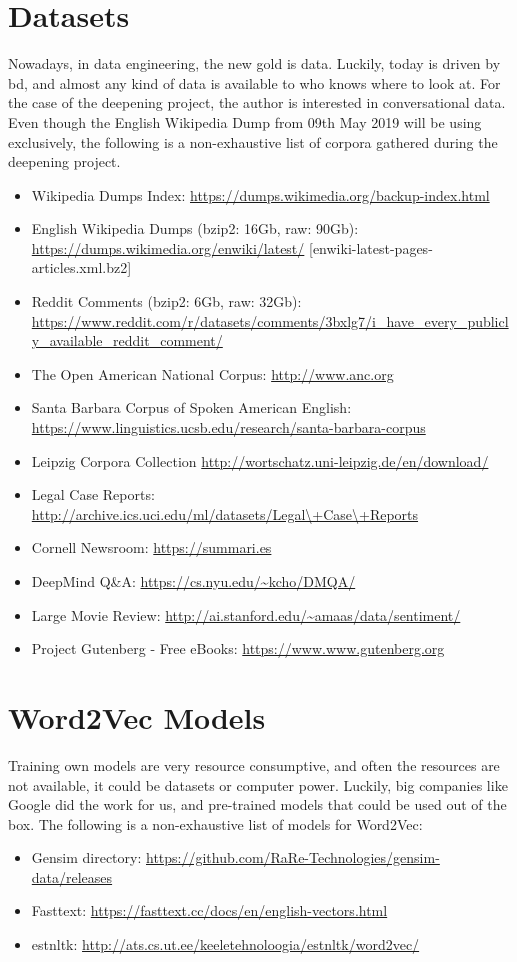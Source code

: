 \section{Datasets}
Nowadays, in data engineering, the new gold is data. Luckily, today is driven by \gls{bd}, and almost any kind of data is available to who knows where to look at. For the case of the deepening project, the author is interested in conversational data. Even though the English Wikipedia Dump from 09th May 2019 will be using exclusively, the following is a non-exhaustive list of corpora gathered during the deepening project.

\begin{itemize}
    \setlength\itemsep{0em}
    \item Wikipedia Dumps Index: \url{https://dumps.wikimedia.org/backup-index.html}
    \item English Wikipedia Dumps (bzip2: 16Gb, raw: 90Gb): \url{https://dumps.wikimedia.org/enwiki/latest/} [enwiki-latest-pages-articles.xml.bz2]
    \item Reddit Comments (bzip2: 6Gb, raw: 32Gb): \url{https://www.reddit.com/r/datasets/comments/3bxlg7/i_have_every_publicly_available_reddit_comment/}
    \item The Open American National Corpus: \url{http://www.anc.org}
    \item Santa Barbara Corpus of Spoken American English: \url{https://www.linguistics.ucsb.edu/research/santa-barbara-corpus}
    \item Leipzig Corpora Collection \url{http://wortschatz.uni-leipzig.de/en/download/}
    \item Legal Case Reports: \url{http://archive.ics.uci.edu/ml/datasets/Legal\+Case\+Reports}
    \item Cornell Newsroom: \url{https://summari.es}
    \item DeepMind Q\&A: \url{https://cs.nyu.edu/\~kcho/DMQA/}
    \item Large Movie Review: \url{http://ai.stanford.edu/\~amaas/data/sentiment/}
    \item Project Gutenberg - Free eBooks: \url{https://www.www.gutenberg.org}
\end{itemize}


\section{Word2Vec Models}
Training own models are very resource consumptive, and often the resources are not available, it could be datasets or computer power. Luckily, big companies like Google did the work for us, and pre-trained models that could be used out of the box. The following is a non-exhaustive list of models for Word2Vec:

\begin{itemize}
    \setlength\itemsep{0em}
    \item Gensim directory: \url{https://github.com/RaRe-Technologies/gensim-data/releases}
    \item Fasttext: \url{https://fasttext.cc/docs/en/english-vectors.html}
    \item estnltk: \url{http://ats.cs.ut.ee/keeletehnoloogia/estnltk/word2vec/}
\end{itemize}


